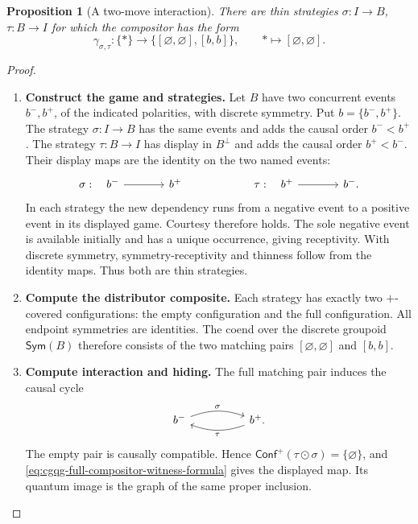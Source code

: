 \documentclass[oneside]{article}
\newcommand{\Conf}{\mathsf{Conf}}
\newcommand{\Sym}{\mathsf{Sym}}
\theoremstyle{plain}
\newtheorem{proposition}[theorem]{Proposition}
\theoremstyle{definition}
\theoremstyle{remark}
\begin{document}
\begin{proposition}[A two-move interaction]
\label{prop:cgqg-two-move-oplax-example}
There are thin strategies \(\sigma:I\to B\), \(\tau:B\to I\) for which
the compositor has the form
\[
 \gamma_{\sigma,\tau}:\{*\}\longrightarrow
       \{[\varnothing,\varnothing],[b,b]\},
 \qquad *\longmapsto[\varnothing,\varnothing].
\]
\end{proposition}
\begin{proof}
    \leavevmode
    \begin{enumerate}[beginpenalty=10000]
        \item \textbf{Construct the game and strategies.}
        Let \(B\) have two concurrent events \(b^-,b^+\), of the indicated
        polarities, with discrete symmetry. Put \(b=\{b^-,b^+\}\).
        The strategy \(\sigma:I\to B\) has the same events and adds the
        causal order \(b^-<b^+\). The strategy \(\tau:B\to I\) has
        display in \(B^\perp\) and adds the causal order \(b^+<b^-\).
        Their display maps are the identity on the two named events:
        \[
        \begin{tikzcd}[column sep=large,row sep=large]
        \sigma:\quad b^-\arrow[r]&b^+
          &\qquad \tau:\quad b^+\arrow[r]&b^-.
        \end{tikzcd}
        \]
        In each strategy the new dependency runs from a negative event
        to a positive event in its displayed game. Courtesy therefore
        holds. The sole negative event is available initially and has a
        unique occurrence, giving receptivity. With discrete symmetry,
        symmetry-receptivity and thinness follow from the identity maps.
        Thus both are thin strategies.

        \item \textbf{Compute the distributor composite.}
        Each strategy has exactly two \(+\)-covered configurations:
        the empty configuration and the full configuration.
        All endpoint symmetries are identities. The coend over the
        discrete groupoid \(\Sym(B)\) therefore consists of the two matching
        pairs \([\varnothing,\varnothing]\) and \([b,b]\).

        \item \textbf{Compute interaction and hiding.}
        The full matching pair induces the causal cycle
        \[
        \begin{tikzcd}[column sep=huge]
        b^-\arrow[r,bend left=20,"\sigma"]
          &b^+\arrow[l,bend left=20,"\tau"].
        \end{tikzcd}
        \]
        The empty pair is causally compatible. Hence
        \(\Conf^+(\tau\odot\sigma)=\{\varnothing\}\), and
        \eqref{eq:cgqg-full-compositor-witness-formula} gives the displayed
        map. Its quantum image is the graph of the same proper inclusion. \qedhere
    \end{enumerate}
\end{proof}
\end{document}
